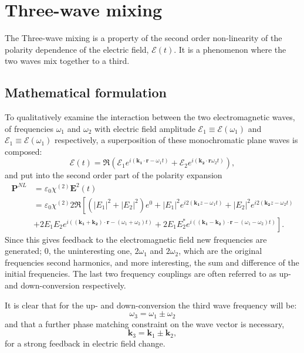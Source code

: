 \chapter{Three-wave mixing}
\label{cha:mixing}


The Three-wave mixing is a property of the second order non-linearity of the polarity dependence of the electric field, $\mathcal{E}(t)$. 
It is a phenomenon where the two waves mix together to a third. 



\section{Mathematical formulation}
\label{sec:mixing-math}

To qualitatively examine the interaction between the two electromagnetic waves, of frequencies $\omega_1$ and $\omega_2$ with electric field amplitude $\mathcal{E}_1  \equiv \mathcal{E}(\omega_1)$ and $\mathcal{E}_1  \equiv \mathcal{E}(\omega_1)$ respectively, a superposition of these monochromatic plane waves is composed: 
\[
\mathbf{\mathcal{E}}(t) = \Re (\mathcal{E}_1e^{i(\mathbf{k_1} \cdot \mathbf{r} - \omega_1 t)}+\mathcal{E}_2e^{i(\mathbf{k_2} \cdot \mathbf{r} \omega_2 t)}),
\]
and put into the second order part of the polarity expansion \cite[sec.~21.2C]{saleh}
\begin{align}
     \mathbf{P}^{NL} & = \varepsilon_0 \chi^{(2)} \mathbf{E}^2(t) \nonumber \\
&= \varepsilon_0 \chi^{(2)} 2 \Re \left[
\left(|E_1|^2+|E_2|^2\right)e^{0} + |E_1|^2e^{i2(\mathbf{k_1} z - \omega_1t)}+|E_2|^2e^{i2(\mathbf{k_2} z - \omega_2t)} \right.\nonumber \\
& \left. +2E_1E_2e^{i((\mathbf{k_1} + \mathbf{k_2}) \cdot \mathbf{r} - (\omega_1+\omega_2)t)}  +2E_1E_2^*e^{i((\mathbf{k_1} - \mathbf{k_2}) \cdot \mathbf{r} - (\omega_1-\omega_2)t)} \right] \label{eq:MixPNL}.
\end{align}
Since this gives feedback to the electromagnetic field new frequencies are generated; $0$, the uninteresting one, $2\omega_1$ and $2\omega_2$, which are the original frequencies second harmonics, and more interesting, the sum and difference of the initial frequencies. The last two frequency couplings are often referred to as up- and down-conversion respectively.

It is clear that for the up- and down-conversion the third wave frequency will be:
\[
\omega_3 = \omega_1 \pm \omega_2
\]
and that a further phase matching constraint on the wave vector is necessary,
\[
\mathbf{k}_3 = \mathbf{k}_1 \pm \mathbf{k}_2,
\]
for a strong feedback in electric field change.





